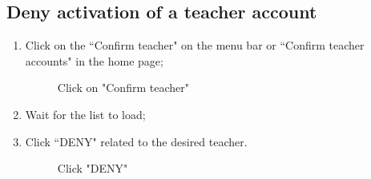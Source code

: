 \documentclass[ManualeUtente]{subfiles}
\begin{document}
\subsection{Deny activation of a teacher account}
\begin{enumerate}
	\item Click on the \textquotedblleft Confirm teacher" on the menu bar or \textquotedblleft Confirm teacher accounts" in the home page;
	\begin{figure}[H]
		\centering
		\caption{Click on "Confirm teacher"}
		\label{fig:Click on "Confirm teacher"}
	\end{figure}
	\item Wait for the list to load;
	\item Click \textquotedblleft DENY" related to the desired teacher.
	\begin{figure}[H]
		\centering
		\caption{Click "DENY"}
		\label{fig:Click "DENY"}
	\end{figure}
\end{enumerate}
\end{document}

